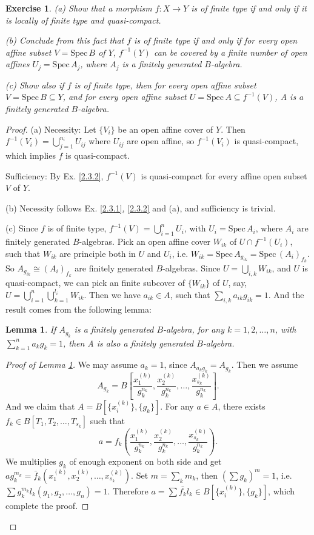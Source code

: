 \documentclass[12pt]{amsart}
\newtheorem{lm}[theorem]{Lemma}
\newtheorem{exe}{Exercise}[subsection]
\begin{document}
\begin{exe}
(a) Show that a morphism $f:X\rightarrow Y$ is of finite type if and only if it is locally of finite type and quasi-compact.

(b) Conclude from this fact that $f$ is of finite type if and only if for every open affine subset $V=\mathrm{Spec}\,B$ of $Y$, $f^{-1}(Y)$ can be covered
by a finite number of open affines $U_j=\mathrm{Spec}\,A_j$, where $A_j$ is a finitely generated $B$-algebra.

(c) Show also if $f$ is of finite type, then for every open affine subset $V=\mathrm{Spec}\,B\subseteq Y$, and for every open affine
subset $U=\mathrm{Spec}\,A\subseteq f^{-1}(V)$, A is a finitely generated $B$-algebra.
\end{exe}
\begin{proof}
(a) Necessity: Let $\{V_i\}$ be an open affine cover of $Y$. Then $f^{-1}(V_i)=\bigcup_{j=1}^{n_i}U_{ij}$ where $U_{ij}$ are open affine, so $f^{-1}(V_i)$ is quasi-compact, which implies $f$ is quasi-compact.

Sufficiency: By Ex. \ref{2.3.2}, $f^{-1}(V)$ is quasi-compact for every affine open subset $V$ of $Y$.

(b) Necessity follows Ex. \ref{2.3.1}, \ref{2.3.2} and (a), and sufficiency is trivial.

(c) Since $f$ is of finite type, $f^{-1}(V)=\bigcup_{i=1}^nU_i$, with $U_i=\mathrm{Spec}\,A_i$, where $A_i$ are finitely generated $B$-algebras. Pick an open affine cover $W_{ik}$ of $U\cap f^{-1}(U_i)$, such that 
$W_{ik}$ are principle both in $U$ and $U_i$, i.e. $W_{ik}=\mathrm{Spec}\,A_{g_{ik}}=\mathrm{Spec}\,(A_{i})_{f_{k}}$. So $A_{g_{ik}}\cong (A_{i})_{f_k}$ are finitely generated $B$-algebras. Since $U=\bigcup_{i,k} W_{ik}$, and
$U$ is quasi-compact, we can pick an finite subcover of $\{W_{ik}\}$ of $U$, say, $U=\bigcup_{i=1}^n\bigcup_{k=1}^{l_i}W_{ik}$. Then we have $a_{ik}\in A$, such that $\sum_{i,k} a_{ik}g_{ik}=1$.
And the result comes from the following lemma:
\begin{lm}
	\label{l3}
	If $A_{g_k}$ is a finitely generated $B$-algebra, for any $k=1,2,\dots,n$, with $\sum_{k=1}^n a_kg_k=1$, then A is also a finitely generated $B$-algebra.
\end{lm}
\begin{proof}[Proof of Lemma \ref*{l3}]
	We may assume $a_k=1$, since $A_{a_kg_k}=A_{g_k}$. Then we assume $$A_{g_k}=B\left[\frac{x_1^{(k)}}{g_k^{n_k}},\frac{x_2^{(k)}}{g_k^{n_k}},\dots,\frac{x_{s_k}^{(k)}}{g_k^{n_k}}\right].$$
	And we claim that $A=B[\{x_i^{(k)}\},\{g_k\}]$. For any $a\in A$, there exists $f_k\in B[T_1,T_2,\dots,T_{s_k}]$ such that $$a=f_k\left(\frac{x_1^{(k)}}{g_k^{n_k}},\frac{x_2^{(k)}}{g_k^{n_k}},\dots,\frac{x_{s_k}^{(k)}}{g_k^{n_k}}\right).$$
	We multiplies $g_k$ of enough exponent on both side and get $ag_k^{m_k}=\bar {f}_k(x_1^{(k)},x_2^{(k)},\dots,x_{s_k}^{(k)})$. Set $m=\sum_k m_k$, then $ (\sum g_k)^m=1$, i.e. $\sum g_k^{m_k}l_k(g_1,g_2,\dots,g_n)=1$.
	Therefore $a=\sum \bar{f_k}l_k\in B[\{x_i^{(k)}\},\{g_k\}]$, which complete the proof.
\end{proof}
\end{proof}
\end{document}
